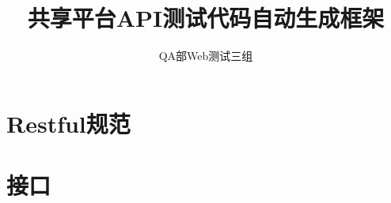 \documentclass{article}
\begin{document}
\title{共享平台API测试代码自动生成框架}

\author{QA部Web测试三组}

\maketitle

\section{Restful规范}

\section{接口}
\end{document}
